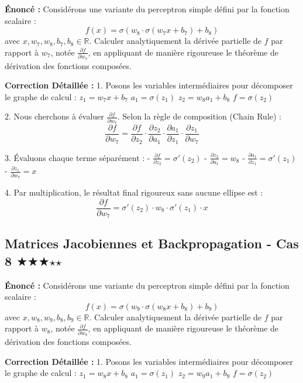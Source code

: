 \documentclass[11pt,a4paper]{article}
\begin{document}
\textbf{Énoncé :}
Considérons une variante du perceptron simple défini par la fonction scalaire :
$$ f(x) = \sigma(w_{8} \cdot \sigma(w_{7} x + b_{7}) + b_{8}) $$
avec $x, w_{7}, w_{8}, b_{7}, b_{8} \in \mathbb{R}$.
Calculer analytiquement la dérivée partielle de $f$ par rapport à $w_{7}$, notée $\frac{{\partial f}}{{\partial w_{7}}}$, en appliquant de manière rigoureuse le théorème de dérivation des fonctions composées.

\textbf{Correction Détaillée :}
1. Posons les variables intermédiaires pour décomposer le graphe de calcul :
   $z_1 = w_{7} x + b_{7}$
   $a_1 = \sigma(z_1)$
   $z_2 = w_{8} a_1 + b_{8}$
   $f = \sigma(z_2)$

2. Nous cherchons à évaluer $\frac{{\partial f}}{{\partial w_{7}}}$. Selon la règle de composition (Chain Rule) :
   $$ \frac{{\partial f}}{{\partial w_{7}}} = \frac{{\partial f}}{{\partial z_2}} \cdot \frac{{\partial z_2}}{{\partial a_1}} \cdot \frac{{\partial a_1}}{{\partial z_1}} \cdot \frac{{\partial z_1}}{{\partial w_{7}}} $$

3. Évaluons chaque terme séparément :
   - $\frac{{\partial f}}{{\partial z_2}} = \sigma'(z_2)$
   - $\frac{{\partial z_2}}{{\partial a_1}} = w_{8}$
   - $\frac{{\partial a_1}}{{\partial z_1}} = \sigma'(z_1)$
   - $\frac{{\partial z_1}}{{\partial w_{7}}} = x$

4. Par multiplication, le résultat final rigoureux sans aucune ellipse est :
   $$ \frac{{\partial f}}{{\partial w_{7}}} = \sigma'(z_2) \cdot w_{8} \cdot \sigma'(z_1) \cdot x $$

\vspace{1cm}

\subsection*{Matrices Jacobiennes et Backpropagation - Cas 8 $\bigstar$$\bigstar$$\bigstar$$\star$$\star$}

\textbf{Énoncé :}
Considérons une variante du perceptron simple défini par la fonction scalaire :
$$ f(x) = \sigma(w_{9} \cdot \sigma(w_{8} x + b_{8}) + b_{9}) $$
avec $x, w_{8}, w_{9}, b_{8}, b_{9} \in \mathbb{R}$.
Calculer analytiquement la dérivée partielle de $f$ par rapport à $w_{8}$, notée $\frac{{\partial f}}{{\partial w_{8}}}$, en appliquant de manière rigoureuse le théorème de dérivation des fonctions composées.

\textbf{Correction Détaillée :}
1. Posons les variables intermédiaires pour décomposer le graphe de calcul :
   $z_1 = w_{8} x + b_{8}$
   $a_1 = \sigma(z_1)$
   $z_2 = w_{9} a_1 + b_{9}$
   $f = \sigma(z_2)$
\end{document}

